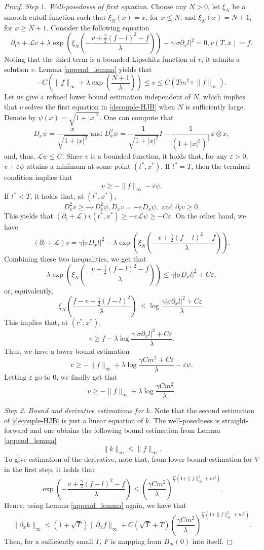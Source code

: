 \documentclass[10pt,a4paper]{amsart}
\begin{document}
\begin{proof}
{\it Step $1$. Well-posedness of first equation.} Choose any $N>0$, let $\xi_N$ be a smooth cutoff function such that $\xi_N(x)=x$, for $x\le N$; and $\xi_N(x)=N+1$, for $x\ge N+1$. Consider the following equation 
$$
\partial_t v+\mathcal Lv+\lambda\exp(\xi_N(-\frac{v+\frac{\gamma}{2}(f-l)^2-f}{\lambda}))-\gamma |\sigma \partial_x l|^2=0, v(T,x)=f.
$$
Noting that the third term is a bounded Lipschitz function of $v$, it admits a solution $v$. Lemma \ref{append_lemma} yields that 
$$
-C( \|f\|_{\infty}+\lambda \exp(\frac{N+1}{\lambda}))\le v\le C(Tm^2+\|f\|_{\infty}).
$$
Let us give a refined lower bound estimation independent of $N$, which implies that $v$ solves the first equation in \eqref{decouple-HJB} when $N$ is sufficiently large.
Denote by $\psi(x)=\sqrt{1+|x|^2}$.  One can compute that 
$$
D_x \psi=\frac{x}{\sqrt{1+|x|^2}}\text{ and }  D^2_x \psi= \frac{1}{\sqrt{1+|x|^2}}I -\frac{1}{\left(1+|x|^2\right)^{\frac12}} x\otimes x,
$$
and, thus, $\mathcal L \psi \le C$. Since $v$ is a bounded function, it holds that, for any $\varepsilon>0$, $v+\varepsilon\psi$ attains a minimum at some point $(t^*,x^*)$. If $t^*=T$, then the terminal condition implies that 
$$v\ge -\|f\|_\infty-\varepsilon \psi.
$$
If $t^*<T$, it holds that, at $(t^*,x^*)$,
$$
D^2_x v \ge -\varepsilon D^2_x \psi, D_x v=-\varepsilon D_x \psi,  \text{ and } \partial_t v \ge 0. 
$$
This yields that  $(\partial_t +\mathcal L)v(t^*,x^*) \ge-\varepsilon \mathcal L\psi \ge -C\varepsilon$. On the other hand, we have  
$$
(\partial_t +\mathcal L)v=\gamma |\sigma D_x l|^2-\lambda\exp(\xi_N(-\frac{v+\frac{\gamma}{2}(f-l)^2-f}{\lambda})).
$$
Combining these two inequalities, we get that 
$$
\lambda\exp(\xi_N(-\frac{v+\frac{\gamma}{2}(f-l)^2-f}{\lambda})) \le \gamma |\sigma D_x l|^2 +C\varepsilon,
$$
or, equivalently,
$$
\xi_N(\frac{f-v-\frac{\gamma}{2}(f-l)^2}{\lambda})\ \le \log \frac{\gamma|\sigma \partial_x l|^2+C\varepsilon}{\lambda}.
$$
This implies that,  at $(r^*,x^*)$,
$$
v \ge f-\lambda  \log \frac{\gamma|\sigma \partial_x l|^2+C\varepsilon}{\lambda}.
$$
Thus, we have a lower bound estimation
$$
v\ge -\|f\|_\infty +\lambda \log \frac{\gamma Cm^2+C\varepsilon}{\lambda}-\varepsilon \psi.
$$
Letting $\varepsilon$ go to $0$, we finally get that 
$$
v\ge -\|f\|_\infty +\lambda \log \frac{\gamma Cm^2}{\lambda}.
$$

{\it Step 2. Bound and derivative estimations for $k$.} Note that the second estimation of \eqref{decouple-HJB} is just a linear equation of $k$. The well-posedness is straight-forward and one obtains the following bound estimation from Lemma \ref{append_lemma} 
$$
\|k\|_{\infty} \le \|f\|_{\infty}.
$$
To give estimation of the derivative, note that, from lower bound estimation for $V$ in the first step, it holds that 
$$
\exp(-\frac{v+\frac\gamma2(f-l)^2-f}{\lambda}) \le (\frac{\gamma Cm^2}{\lambda})^{\frac{C}{\lambda}(1+\|f\|^2_\infty+m^2)}.
$$
Hence, using Lemma \ref{append_lemma} again, we have that 
$$
\|\partial_x k\|_{\infty} \le (1+\sqrt{T})\|\partial_x f\|_{\infty}+C(\sqrt{T}+T)(\frac{\gamma Cm^2}{\lambda})^{\frac{C}{\lambda}(1+\|f\|^2_\infty+m^2)}. 
$$
Then, for a sufficiently small $T$, $F$ is mapping from $B_m(0)$ into itself. 


\end{proof}
\end{document}
